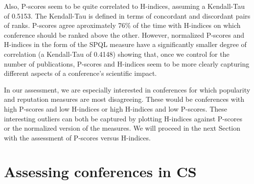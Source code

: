 \documentclass[notitlepage]{svjour3}
\begin{document}
Also, P-scores seem to be quite correlated to H-indices, assuming a Kendall-Tau of 0.5153.
The Kendall-Tau is defined in terms of concordant and discordant pairs of ranks.
P-scores agree aproximately 76\% of the time with H-indices on which conference should be
ranked above the other. However, normalized P-scores and H-indices in the form of the SPQL
measure have a significantly smaller degree of correlation (a Kendall-Tau of 0.4148) 
showing that, once we control for the number of publications, P-scores and H-indices seem
to be more clearly capturing different aspects of a conference's scientific impact. 

In our assessment, we are especially interested in conferences for which popularity 
and reputation measures are most disagreeing. These would be conferences with high P-scores 
and low H-indices or high H-indices and low P-scores. These interesting outliers can both
be captured by plotting H-indices against P-scores or the normalized version of the measures.
We will proceed in the next Section with the assessment of P-scores versus H-indices.


\section{Assessing conferences in CS}
\label{sec:notifications}
\end{document}
